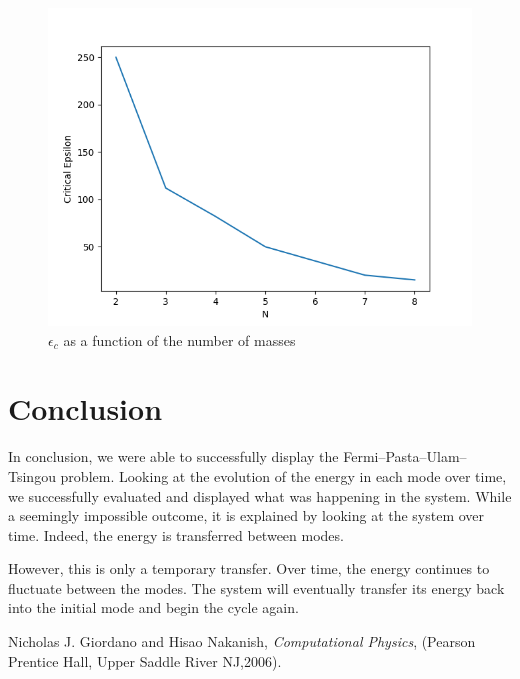 \documentclass[pra,twocolumn,showpacs,amsmath,amssymb]{revtex4-2}
\begin{document}
\begin{figure}[t!]
\includegraphics[scale=0.50]{Epsc_N.png}
\caption{$\epsilon_c$ as a function of the number of masses}\label{position}
\end{figure}

\section{Conclusion} \label{sec:conclusion}

In conclusion, we were able to successfully display the Fermi–Pasta–Ulam–Tsingou problem. Looking at the evolution of the energy in each mode over time, we successfully evaluated and displayed what was happening in the system. While a seemingly impossible outcome, it is explained by looking at the system over time. Indeed, the energy is transferred between modes. 
\par However, this is only a temporary transfer. Over time, the energy continues to fluctuate between the modes. The system will eventually transfer its energy back into the initial mode and begin the cycle again.

\begin{thebibliography}{9}
\bibitem{}Nicholas J. Giordano and Hisao Nakanish, \emph{Computational Physics}, (Pearson Prentice Hall, Upper Saddle River NJ,2006).
\end{thebibliography}
\end{document}
